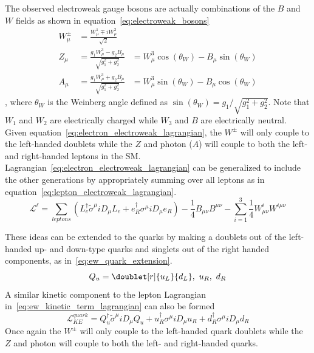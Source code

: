 The observed electroweak gauge bosons are actually combinations of the $B$ and $W$ fields as shown in equation~\ref{eq:electroweak_bosons}
\begin{align}\label{eq:electroweak_bosons}
	W_{\mu}^{\pm}&=\frac{W_{\mu}^{1}{\mp}iW_{\mu}^{2}}{\sqrt{2}}\\
	Z_{\mu}&=\frac{g_{1}W_{\mu}^{3}-g_{2}B_{\mu}}{\sqrt{g_{1}^{2}+g_{2}^{2}}}&=W_{\mu}^{3}\cos\left(\theta_{W}\right)-B_{\mu}\sin\left(\theta_{W}\right)\\
	A_{\mu}&=\frac{g_{1}W_{\mu}^{3}+g_{2}B_{\mu}}{\sqrt{g_{1}^{2}+g_{2}^{2}}}&=W_{\mu}^{3}\sin\left(\theta_{W}\right)-B_{\mu}\cos\left(\theta_{W}\right)
\end{align}
, where $\theta_{W}$ is the Weinberg angle defined as $\sin\left(\theta_{W}\right)=g_{1}/\sqrt{g_{1}^{2}+g_{2}^{2}}$.
Note that $W_{1}$ and $W_{2}$ are electrically charged while $W_{3}$ and $B$ are electrically neutral.
Given equation~\ref{eq:electron_electroweak_lagrangian}, the $W^{\pm}$ will only couple to the left-handed doublets while the $Z$ and photon ($A$) will couple to both the left- and right-handed leptons in the SM.
Lagrangian~\ref{eq:electron_electroweak_lagrangian} can be generalized to include the other generations by appropriately summing over all leptons as in equation~\ref{eq:lepton_electroweak_lagrangian}.
\begin{equation}\label{eq:lepton_electroweak_lagrangian}
	\mathcal{L}^{\ell}=\sum_{leptons}\left(L_{e}^{\dagger}\tilde{\sigma}^{\mu}iD_{\mu}L_{e}+e_{R}^{\dagger}\sigma^{\mu}iD_{\mu}e_{R}\right)-\frac{1}{4}B_{\mu\nu}B^{\mu\nu}-\sum_{i=1}^{3}\frac{1}{4}W_{\mu\nu}^{i}W^{i\mu\nu}
\end{equation}

These ideas can be extended to the quarks by making a doublets out of the left-handed up- and down-type quarks and singlets out of the right handed components, as in~\ref{eq:ew_quark_extension}.
\begin{equation}\label{eq:ew_quark_extension}
	Q_{u}=\doublet[r]{u_{L}}{d_{L}},\text{ }u_{R},\text{ }d_{R}
\end{equation}
A similar kinetic component to the lepton Lagrangian in~\ref{eq:ew_kinetic_term_lagrangian} can also be formed
\begin{equation}\label{eq:ew_quark_kinetic_term_lagrangian}
	\mathcal{L}_{KE}^{quark}=Q_{u}^{\dagger}\tilde{\sigma}^{\mu}iD_{\mu}Q_{u}+u_{R}^{\dagger}\sigma^{\mu}iD_{\mu}u_{R}+d_{R}^{\dagger}\sigma^{\mu}iD_{\mu}d_{R}
\end{equation}
Once again the $W^{\pm}$ will only couple to the left-handed quark doublets while the $Z$ and photon will couple to both the left- and right-handed quarks.

